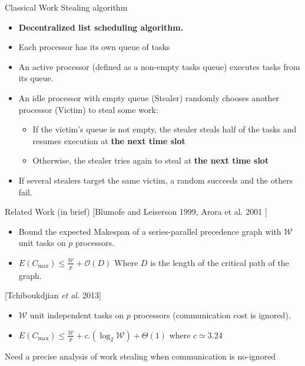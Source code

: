\documentclass{beamer}
\begin{document}
\begin{frame}{Classical Work Stealing algorithm}

 \begin{itemize}
     \item \textbf{Decentralized list scheduling algorithm.}
        \item { Each processor has its own queue of tasks}                                     
        \item { An active processor (defined as a non-empty tasks queue) executes tasks from its queue.}
        \item { An idle processor with empty queue (\alert{Stealer}) randomly chooses another processor (\alert{Victim}) to steal some work:}                                     
                    \pause
            \begin{itemize}
                \item {If the victim's queue is not empty, the stealer steals half of the tasks and resumes execution at \textbf{the next time slot}}
                \item {Otherwise, the stealer tries again to steal at \textbf{the next time slot}}
            \end{itemize}
        \item {If several stealers target the same victim, a random succeeds and the others fail.} 

    \end{itemize}
\end{frame}


\begin{frame}{Related Work (in brief)}
    \color{blue} {[Blumofe and Leiserson 1999, Arora et al. 2001  ]}
        \begin{itemize}        
            \item Bound the expected Makespan of a series-parallel precedence graph with $\mathcal{W}$ unit tasks on $p$ processors.
             \item $E(C_{\max}) \leq \frac{\mathcal{W}}{p}+\mathcal{O}(D)$  Where $D$ is the length of the \alert{critical path} of the graph.
        \end{itemize}  
    \color{blue} [Tchiboukdjian \textit{et al.} 2013] 
         \begin{itemize}        
             \item $\mathcal{W}$ unit independent tasks on $p$ processors (communication cost is ignored).  
             \item $E(C_{\max}) \leq \frac{\mathcal{W}}{p}+c.(\log_2 \mathcal{W})+\Theta(1)$ where $c \simeq3.24$ 
        \end{itemize}  

        \alert{Need a precise analysis of work stealing when communication is no-ignored}
\end{frame}
\end{document}
